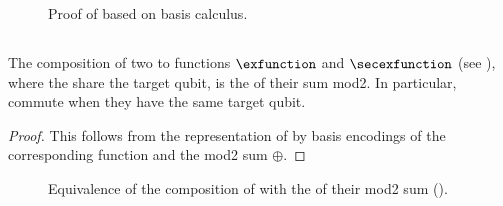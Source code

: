 %        

\begin{figure}
    \begin{center}
        
    \end{center}
    \caption{
        Proof of  based on basis calculus.
    }\label{fig:proofDecomposition}
\end{figure}



\subsection{\PolynomialSparsity{}}

\begin{lemma} %
    \label{lem:comCircuitCommutative}
    The composition of two \computationCircuits{} to functions $\exfunction$ and $\secexfunction$ (see ), where the \computationCircuits{} share the target qubit, is the \computationCircuit{} of their sum mod2.
    In particular, \computationCircuits{} commute when they have the same target qubit.
\end{lemma}
\begin{proof}
    This follows from the representation of \computationCircuits{} by basis encodings of the corresponding function and the mod2 sum $\oplus$.
\end{proof}

\begin{figure}[t]
    \begin{center}
        
    \end{center}
    \caption{Equivalence of the composition of \computationCircuits{} with the \computationCircuit{} of their mod2 sum ().}
    \label{fig:mod2ComputationCircuit}
\end{figure}

